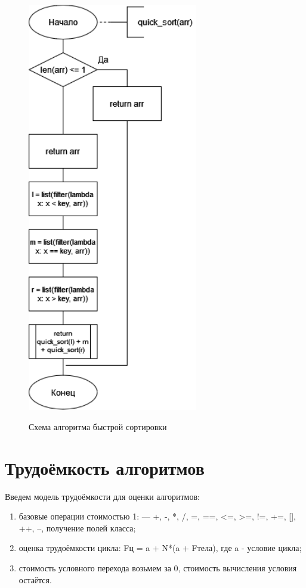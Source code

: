 \documentclass[12pt]{report}
\begin{document}
\begin{figure}
	\begin{center}
	{\includegraphics[height = 18cm]{quick.jpg}}
	\caption{Схема алгоритма быстрой сортировки}
	\label{ris:imageQuick}
	\end{center}
\end{figure}

\newpage
\section{Трудоёмкость алгоритмов}
Введем модель трудоёмкости для оценки алгоритмов:
\begin{enumerate}
  	\item базовые операции стоимостью 1: — +, -, *, /, =, ==, <=, >=, !=, +=, [], ++, --, получение полей класса;
	\item оценка трудоёмкости цикла: Fц = a + N*(a + Fтела), где a - условие цикла;
	\item стоимость условного перехода возьмем за 0, стоимость вычисления условия остаётся.
\end{enumerate}
\end{document}
